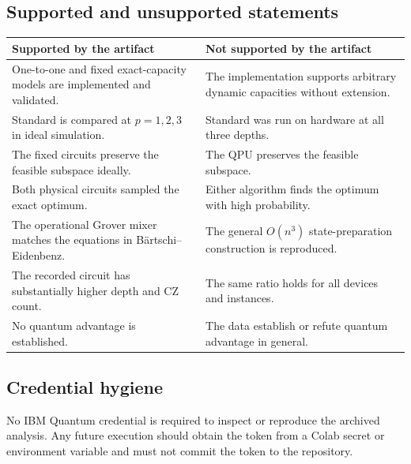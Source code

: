 \subsection{Supported and unsupported statements}

\begin{table}[H]
\centering
\small
\begin{tabularx}{\textwidth}{>{\raggedright\arraybackslash}X>{\raggedright\arraybackslash}X}
\toprule
Supported by the artifact & Not supported by the artifact\\
\midrule
One-to-one and fixed exact-capacity \QUBO{} models are implemented and validated. & The implementation supports arbitrary dynamic capacities without extension.\\
Standard \QAOA{} is compared at $p=1,2,3$ in ideal simulation. & Standard \QAOA{} was run on hardware at all three depths.\\
The fixed \GMQAOA{} circuits preserve the feasible subspace ideally. & The QPU preserves the \GMQAOA{} feasible subspace.\\
Both physical circuits sampled the exact optimum. & Either algorithm finds the optimum with high probability.\\
The operational Grover mixer matches the equations in Bärtschi--Eidenbenz. & The general $O(n^3)$ state-preparation construction is reproduced.\\
The recorded \GMQAOA{} circuit has substantially higher depth and CZ count. & The same ratio holds for all devices and instances.\\
No quantum advantage is established. & The data establish or refute quantum advantage in general.\\
\bottomrule
\end{tabularx}
\end{table}

\subsection{Credential hygiene}

No IBM Quantum credential is required to inspect or reproduce the archived analysis. Any future execution should obtain the token from a Colab secret or environment variable and must not commit the token to the repository.

